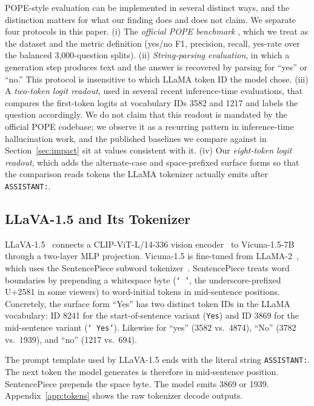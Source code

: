 \documentclass{article}
\begin{document}
POPE-style evaluation can be implemented in several distinct ways, and
the distinction matters for what our finding does and does not claim.
We separate four protocols in this paper. (i) The \emph{official POPE
benchmark} \citep{li2023evaluating}, which we treat as the dataset and
the metric definition (yes/no F1, precision, recall, yes-rate over the
balanced 3{,}000-question splits). (ii) \emph{String-parsing
evaluation}, in which a generation step produces text and the answer
is recovered by parsing for ``yes'' or ``no.'' This protocol is
insensitive to which LLaMA token ID the model chose. (iii) A
\emph{two-token logit readout}, used in several recent inference-time
evaluations, that compares the first-token logits at vocabulary IDs
3582 and 1217 and labels the question accordingly. We do not claim
that this readout is mandated by the official POPE codebase; we
observe it as a recurring pattern in inference-time hallucination
work, and the published baselines we compare against in
Section~\ref{sec:impact} sit at values consistent with it. (iv) Our
\emph{eight-token logit readout}, which adds the alternate-case and
space-prefixed surface forms so that the comparison reads tokens the
LLaMA tokenizer actually emits after \texttt{ASSISTANT:}.

\subsection{LLaVA-1.5 and Its Tokenizer}

LLaVA-1.5~\citep{liu2023improved} connects a CLIP-ViT-L/14-336 vision
encoder~\citep{radford2021learning} to Vicuna-1.5-7B through a two-layer
MLP projection. Vicuna-1.5 is fine-tuned from LLaMA-2~\citep{touvron2023llama2},
which uses the SentencePiece subword tokenizer~\citep{kudo2018sentencepiece}.
SentencePiece treats word boundaries by prepending a whitespace byte
(\texttt{`\,'}, the underscore-prefixed U+2581 in some viewers) to
word-initial tokens in mid-sentence positions. Concretely, the surface
form ``Yes'' has two distinct token IDs in the LLaMA vocabulary: ID 8241
for the start-of-sentence variant (\texttt{Yes}) and ID 3869 for the
mid-sentence variant (\texttt{`\,Yes'}). Likewise for ``yes'' (3582 vs.\
4874), ``No'' (3782 vs.\ 1939), and ``no'' (1217 vs.\ 694).

The prompt template used by LLaVA-1.5 ends with the literal string
\texttt{ASSISTANT:}. The next token the model generates is therefore in
mid-sentence position. SentencePiece prepends the space byte. The model
emits 3869 or 1939. Appendix~\ref{app:tokens} shows the raw tokenizer
decode outputs.
\end{document}
